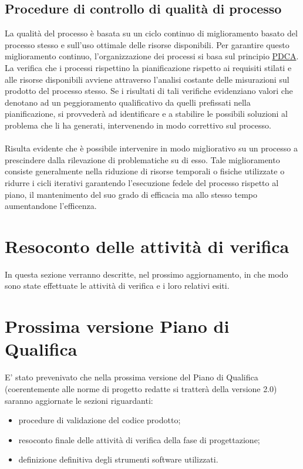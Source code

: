 \subsection{Procedure di controllo di qualità di processo}
La qualità del processo è basata su un ciclo continuo di miglioramento basato del processo stesso e sull'uso ottimale delle risorse disponibili. 
Per garantire questo miglioramento continuo, l’organizzazione dei processi si basa sul principio \underline{PDCA}. La verifica che i processi rispettino la pianificazione rispetto ai requisiti stilati e alle risorse disponibili avviene attraverso l’analisi costante delle misurazioni sul prodotto del processo stesso.
Se i risultati di tali verifiche evidenziano valori che denotano ad un peggioramento qualificativo da quelli prefissati nella pianificazione, si provvederà ad identificare e a stabilire le possibili soluzioni al problema che li ha generati, intervenendo in modo correttivo sul processo. \\\\
Risulta evidente che è possibile intervenire in modo migliorativo su un processo a prescindere dalla rilevazione di problematiche su di esso. Tale miglioramento consiste generalmente nella riduzione di risorse temporali o fisiche utilizzate o ridurre i cicli iterativi garantendo l'esecuzione fedele del processo rispetto al piano, il mantenimento del suo grado di efficacia ma allo stesso tempo aumentandone l'efficenza.

\clearpage
\section{Resoconto delle attività di verifica}
In questa sezione verranno descritte, nel prossimo aggiornamento, in che modo sono state effettuate le attività di verifica e i loro relativi esiti.

\section{Prossima versione Piano di Qualifica}
E' stato prevenivato che nella prossima versione del Piano di Qualifica (coerentemente alle norme di progetto redatte si tratterà della versione 2.0) saranno aggiornate le sezioni riguardanti:
\begin{itemize}
\item procedure di validazione del codice prodotto;
\item resoconto finale delle attività di verifica della fase di progettazione;
\item definizione definitiva degli strumenti software utilizzati.
\end{itemize}

